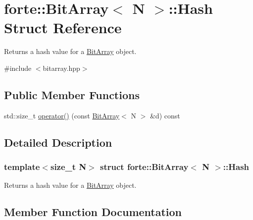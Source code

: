 \hypertarget{structforte_1_1_bit_array_1_1_hash}{}\section{forte\+:\+:Bit\+Array$<$ N $>$\+:\+:Hash Struct Reference}
\label{structforte_1_1_bit_array_1_1_hash}


Returns a hash value for a \mbox{\hyperlink{classforte_1_1_bit_array}{Bit\+Array}} object.  




{\ttfamily \#include $<$bitarray.\+hpp$>$}

\subsection*{Public Member Functions}
\begin{DoxyCompactItemize}
\item 
std\+::size\+\_\+t \mbox{\hyperlink{structforte_1_1_bit_array_1_1_hash_a98579cd32685db0cb41b63ce08737049}{operator()}} (const \mbox{\hyperlink{classforte_1_1_bit_array}{Bit\+Array}}$<$ N $>$ \&d) const
\end{DoxyCompactItemize}


\subsection{Detailed Description}
\subsubsection*{template$<$size\+\_\+t N$>$\newline
struct forte\+::\+Bit\+Array$<$ N $>$\+::\+Hash}

Returns a hash value for a \mbox{\hyperlink{classforte_1_1_bit_array}{Bit\+Array}} object. 

\subsection{Member Function Documentation}
\mbox{\label{structforte_1_1_bit_array_1_1_hash_a98579cd32685db0cb41b63ce08737049}} 
